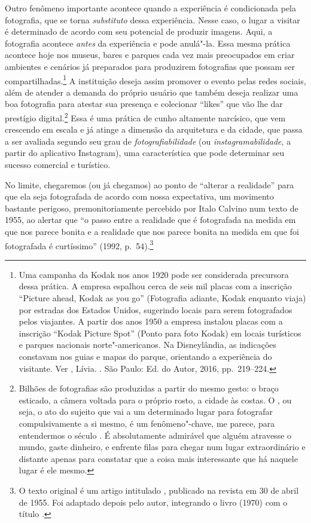Outro fenômeno importante acontece quando a experiência é condicionada
pela fotografia, que se torna \emph{substituto} dessa experiência. Nesse
caso, o lugar a visitar é determinado de acordo com seu potencial de
produzir imagens. Aqui, a fotografia acontece \emph{antes} da
experiência e pode anulá"-la. Essa mesma prática acontece hoje nos
museus, bares e parques cada vez mais preocupados em criar ambientes e
cenários já preparados para produzirem fotografias que possam ser
compartilhadas.\footnote{Uma campanha da Kodak nos anos 1920 pode ser
  considerada precursora dessa prática. A empresa espalhou cerca de seis
  mil placas com a inscrição ``Picture ahead, Kodak as you
  go'' (Fotografia adiante, Kodak enquanto viaja) por estradas dos
  Estados Unidos, sugerindo locais para serem fotografados pelos
  viajantes. A partir dos anos 1950 a empresa instalou placas com a
  inscrição ``Kodak Picture Spot'' (Ponto para foto Kodak) em locais
  turísticos e parques nacionais norte"-americanos. Na Disneylândia, as
  indicações constavam nos guias e mapas do parque, orientando a
  experiência do visitante. Ver , Lívia. {}. São Paulo: Ed. do Autor,
  2016, pp.~219--224.} A instituição deseja assim promover o evento pelas
redes sociais, além de atender a demanda do próprio usuário que também
deseja realizar uma boa fotografia para atestar sua presença e
colecionar ``likes'' que vão lhe dar prestígio digital.\footnote{Bilhões de fotografias são produzidas a partir do mesmo gesto: o braço esticado, a câmera voltada para o próprio rosto, a cidade às costas. O {}, ou seja, o ato do sujeito que vai a um determinado lugar para fotografar compulsivamente a si mesmo, é um fenômeno"-chave, me parece, para entendermos o século . É absolutamente admirável que alguém atravesse o mundo, gaste dinheiro, e enfrente filas para chegar num lugar extraordinário e distante apenas para constatar que a coisa mais interessante que há naquele lugar é ele mesmo.}
Essa é uma prática de cunho altamente narcísico, que vem crescendo em escala e já atinge a dimensão da arquitetura e da cidade, que passa a ser avaliada segundo seu grau de \emph{fotografiabilidade} (ou \emph{instagramabilidade},
a partir do aplicativo Instagram), uma
característica que pode determinar seu sucesso comercial e turístico.

No limite, chegaremos (ou já chegamos) ao ponto de ``alterar a
realidade'' para que ela seja fotografada de acordo com nossa
expectativa, um movimento bastante perigoso, premonitoriamente percebido
por Italo Calvino num texto de 1955, ao alertar que ``o passo entre a
realidade que é fotografada na medida em que nos parece bonita e a
realidade que nos parece bonita na medida em que foi fotografada é
curtíssimo'' (1992, p.~54).\footnote{O texto original é um artigo
  intitulado {}, publicado na revista {} em 30 de abril de 1955. Foi adaptado depois pelo autor,
  integrando o livro {} (1970) com o título {}.}

